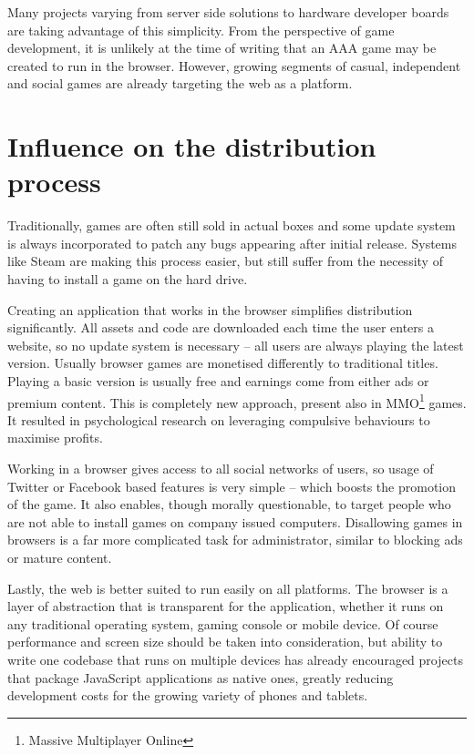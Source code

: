 Many projects varying from server side solutions\cite{nodejs,coder} to hardware developer boards\cite{espruino} are taking advantage of this simplicity. From the perspective of game development, it is unlikely at the time of writing that an AAA game may be created to run in the browser. However, growing segments of casual, independent and social games are already targeting the web as a platform.

\section{Influence on the distribution process}

Traditionally, games are often still sold in actual boxes and some update system is always incorporated to patch any bugs appearing after initial release. Systems like Steam\cite{steam} are making this process easier, but still suffer from the necessity of having to install a game on the hard drive.

Creating an application that works in the browser simplifies distribution significantly. All assets and code are downloaded each time the user enters a website, so no update system is necessary -- all users are always playing the latest version. Usually browser games are monetised differently to traditional titles. Playing a basic version is usually free and earnings come from either ads or premium content. This is completely new approach, present also in MMO\footnote{Massive Multiplayer Online} games. It resulted in psychological research on leveraging compulsive behaviours to maximise profits\cite{exploitative-game-design}.

Working in a browser gives access to all social networks of users, so usage of Twitter or Facebook based features is very simple -- which boosts the promotion of the game. It also enables, though morally questionable, to target people who are not able to install games on company issued computers. Disallowing games in browsers is a far more complicated task for administrator, similar to blocking ads or mature content.

Lastly, the web is better suited to run easily on all platforms. The browser is a layer of abstraction that is transparent for the application, whether it runs on any traditional operating system, gaming console or mobile device. Of course performance and screen size should be taken into consideration, but ability to write one codebase that runs on multiple devices has already encouraged projects that package JavaScript applications as native ones\cite{phonegap}, greatly reducing development costs for the growing variety of phones and tablets.

